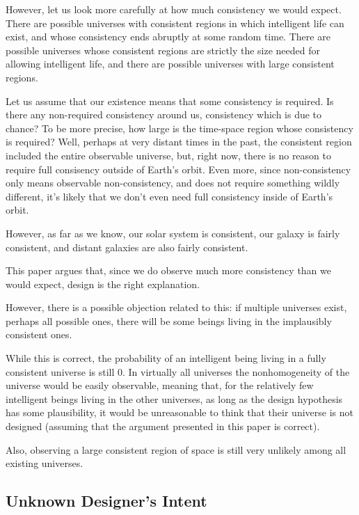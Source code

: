 \documentclass[a4paper
,draft
]{article}
\newcommand{\paper}[1]{paper}
\begin{document}
However, let us look more carefully at how much consistency we would expect.
There are possible universes with consistent regions in which
intelligent life can exist, and whose consistency ends abruptly at some
random time. There are possible universes whose consistent regions are
strictly the size needed for allowing intelligent life, and there are possible
universes with large consistent regions.

Let us assume that our existence means that some consistency is required.
Is there any non-required consistency around us, consistency which is due to
chance? To be more precise,
how large is the time-space region whose consistency is required? Well,
perhaps at very distant times in the past, the consistent region included
the entire observable universe, but, right now, there is no reason to require
full consisency outside of Earth's orbit. Even more, since non-consistency
only means
observable non-consistency, and does not require something wildly different,
it's likely that we don't even need full consistency inside of Earth's orbit.

However, as far as we know, our solar system is consistent, our galaxy is
fairly consistent, and distant galaxies are also fairly consistent.

This \paper{} argues that, since we do observe much more consistency
than we would expect, design is the right explanation.

However, there is a possible objection related to this: if multiple universes
exist, perhaps all possible ones, there will be some beings living in the
implausibly consistent ones.

While this is correct, the probability of an intelligent being
living in a fully consistent universe is still $0$.
In virtually all universes the nonhomogeneity of the universe would be
easily observable, meaning that, for the relatively few intelligent beings
living in the other universes, as long as the design hypothesis
has some plausibility, it would be unreasonable to think that
their universe is not designed (assuming that the argument presented in
this \paper{} is correct).

Also, observing a large consistent region of space is still very unlikely among
all existing universes.


\subsection{Unknown Designer's Intent}
\end{document}
